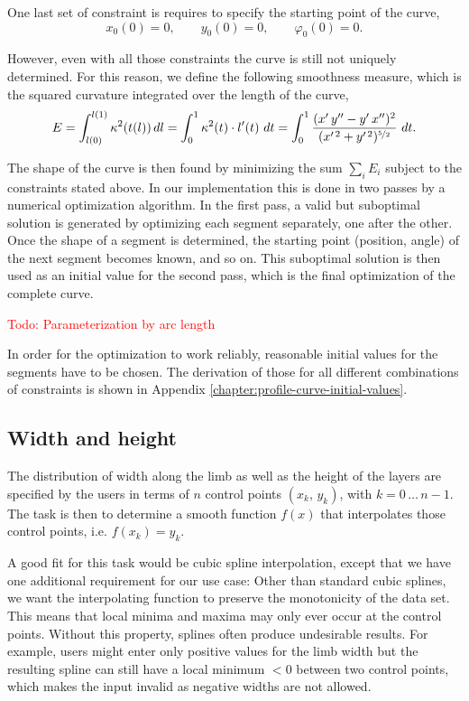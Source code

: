 One last set of constraint is requires to specify the starting point of the curve,
%
\begin{equation}
x_0(0) = 0, \qquad y_0(0) = 0, \qquad \varphi_0(0) = 0.
\end{equation}

However, even with all those constraints the curve is still not uniquely determined.
For this reason, we define the following smoothness measure, which is the squared curvature integrated over the length of the curve,
%
\begin{align}
E = \int_{l(0)}^{l(1)} \kappa^2(t(l))\,dl = \int_{0}^{1} \kappa^2(t)\cdot l'(t)\ dt = \int_{0}^{1} \frac{(x'\,y'' - y'\,x'')^2}{(x'^{\,2} + y'^{\,2})^{\nicefrac{5}{2}}}\ dt.
\end{align}

The shape of the curve is then found by minimizing the sum $\sum_i E_i$ subject to the constraints stated above.
In our implementation this is done in two passes by  a numerical optimization algorithm.
In the first pass, a valid but suboptimal solution is generated by optimizing each segment separately, one after the other.
Once the shape of a segment is determined, the starting point (position, angle) of the next segment becomes known, and so on.
This suboptimal solution is then used as an initial value for the second pass, which is the final optimization of the complete curve.

\textcolor{red}{Todo: Parameterization by arc length}

In order for the optimization to work reliably, reasonable initial values for the segments have to be chosen.
The derivation of those for all different combinations of constraints is shown in Appendix \ref{chapter:profile-curve-initial-values}.

\newpage
\subsection{Width and height}

The distribution of width along the limb as well as the height of the layers are specified by the users in terms of $n$ control points $(x_k,\,y_k)$, with $k = 0\,\ldots\,n-1$.
The task is then to determine a smooth function $f(x)$ that interpolates those control points, i.e. $f(x_k) = y_k$.

A good fit for this task would be cubic spline interpolation, except that we have one additional requirement for our use case: Other than standard cubic splines, we want the interpolating function to preserve the monotonicity of the data set.
This means that local minima and maxima may only ever occur at the control points.
Without this property, splines often produce undesirable results.
For example, users might enter only positive values for the limb width but the resulting spline can still have a local minimum $< 0$ between two control points, which makes the input invalid as negative widths are not allowed.

